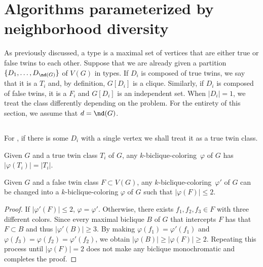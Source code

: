 \section{Algorithms parameterized by neighborhood diversity}

As previously discussed, a type is a maximal set of vertices that are either true or false twins to each other.
Suppose that we are already given a partition $\{D_1, \dots, D_{\nd(G)}\}$ of $V(G)$ in types.
If $D_i$ is composed of true twins, we say that it is a  $T_i$ and, by definition, $G[D_i]$ is a clique.
Similarly, if $D_i$ is composed of false twins, it is a  $F_i$ and $G[D_i]$ is an independent set.
When $|D_i| = 1$, we treat the class differently depending on the problem.
For the entirety of this section, we assume that $d = \nd(G)$.

\subsection{}

For , if there is some $D_i$ with a single vertex we shall treat it as a true twin class.

\begin{observation}
    \label{obs:biclique_true_twins}
    Given $G$ and a true twin class $T_i$ of $G$, any $k$-biclique-coloring~$\varphi$ of $G$ has $|\varphi(T_i)| = |T_i|$.
\end{observation}

\begin{lemma}
    \label{lem:biclique_false_twins}
    Given $G$ and a false twin class $F \subset V(G)$, any  $k$-biclique-coloring~$\varphi'$ of $G$ can be changed into a $k$-biclique-coloring $\varphi$ of $G$ such that $|\varphi(F)| \leq 2$.
\end{lemma}

\begin{proof}
    If $|\varphi'(F)| \leq 2$, $\varphi = \varphi'$.
    Otherwise, there exists $f_1, f_2, f_3 \in F$ with three different colors. 
    Since every maximal biclique $B$ of $G$ that intercepts $F$ has that $F \subset B$ and thus $|\varphi'(B)| \geq 3$.
    By making $\varphi(f_1) = \varphi'(f_1)$ and $\varphi(f_3) = \varphi(f_2) = \varphi'(f_2)$, we obtain $|\varphi(B)| \geq |\varphi(F)| \geq 2$.
    Repeating this process until $|\varphi(F)| = 2$ does not make any biclique monochromatic and completes the proof.
\end{proof}

